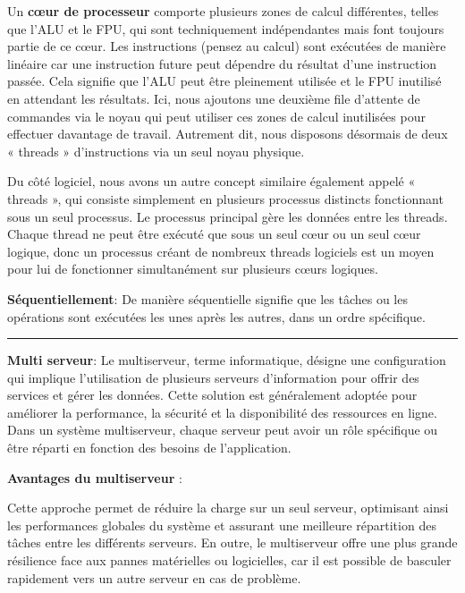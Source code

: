 \noindent Un \textbf{cœur de processeur} comporte plusieurs zones de calcul différentes, telles que l'ALU et le FPU, qui sont techniquement indépendantes mais font toujours partie de ce cœur. Les instructions (pensez au calcul) sont exécutées de manière linéaire car une instruction future peut dépendre du résultat d'une instruction passée. Cela signifie que l'ALU peut être pleinement utilisée et le FPU inutilisé en attendant les résultats. Ici, nous ajoutons une deuxième file d'attente de commandes via le noyau qui peut utiliser ces zones de calcul inutilisées pour effectuer davantage de travail. Autrement dit, nous disposons désormais de deux « threads » d'instructions via un seul noyau physique.

\noindent Du côté logiciel, nous avons un autre concept similaire également appelé « threads », qui consiste simplement en plusieurs processus distincts fonctionnant sous un seul processus. Le processus principal gère les données entre les threads. Chaque thread ne peut être exécuté que sous un seul cœur ou un seul cœur logique, donc un processus créant de nombreux threads logiciels est un moyen pour lui de fonctionner simultanément sur plusieurs cœurs logiques.

\newpage

\noindent \textbf{Séquentiellement}:
\noindent De manière séquentielle signifie que les tâches ou les opérations sont exécutées les unes après les autres, dans un ordre spécifique. 

\begin{center}
\rule{5cm}{0.4pt}
\end{center}

\vspace{0.5cm}

\noindent \textbf{Multi serveur}:
\noindent Le multiserveur, terme informatique, désigne une configuration qui implique l'utilisation de plusieurs serveurs d'information pour offrir des services et gérer les données. Cette solution est généralement adoptée pour améliorer la performance, la sécurité et la disponibilité des ressources en ligne. Dans un système multiserveur, chaque serveur peut avoir un rôle spécifique ou être réparti en fonction des besoins de l'application. 

\noindent \textbf{Avantages du multiserveur} :

\noindent Cette approche permet de réduire la charge sur un seul serveur, optimisant ainsi les performances globales du système et assurant une meilleure répartition des tâches entre les différents serveurs. En outre, le multiserveur offre une plus grande résilience face aux pannes matérielles ou logicielles, car il est possible de basculer rapidement vers un autre serveur en cas de problème.

